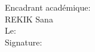 \begin{titlepage}
\begin{flushleft}
\begin{minipage}[c]{0.4\columnwidth}
\end{minipage}
\hfill
\begin{minipage}[c]{0.4\columnwidth}
Encadrant académique: \\ REKIK Sana \\

Le:\\

Signature:\\
\end{minipage}

 \end{flushleft}








\end{titlepage}
%